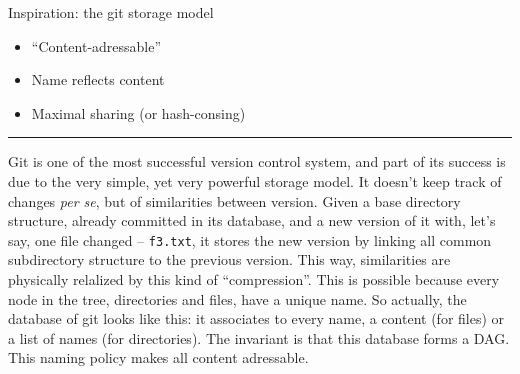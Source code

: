\documentclass[ignorenonframetext,red]{beamer}
\begin{document}
\begin{frame}{Inspiration: the \textsf{git} storage model}
\begin{center}
\begin{overlayarea}{\textwidth}{12em}
    \end{overlayarea}
  \end{center}%
  \begin{itemize}\small %
  \item<7-> ``Content-adressable''%
  \item<8-> Name reflects content%
  \item<9-> Maximal sharing (or hash-consing)%
  \end{itemize}%
\end{frame}
\hrule

\textsf{Git} is one of the most successful version control system, and
part of its success is due to the very simple, yet very powerful
storage model. It doesn't keep track of changes \emph{per se}, but of
similarities between version. Given a base directory structure,
already committed in its database, and a new version of it with, let's
say, one file changed -- \texttt{f3.txt}, it stores the new version by
linking all common subdirectory structure to the previous
version. This way, similarities are physically relalized by this kind
of ``compression''. This is possible because every node in the tree,
directories and files, have a unique name. So actually, the database
of \textsf{git} looks like this: it associates to every name, a
content (for files) or a list of names (for directories). The
invariant is that this database forms a DAG. This naming policy makes
all content adressable.
\end{document}
